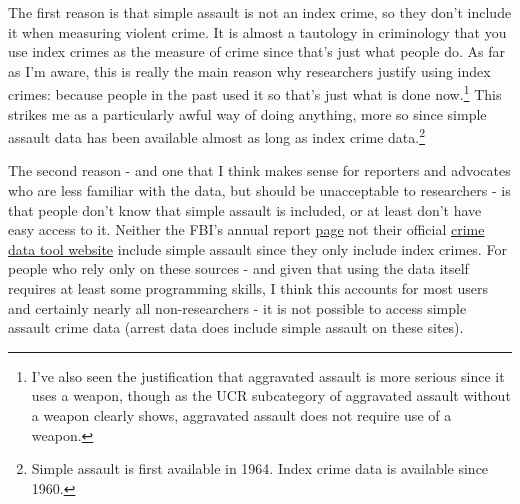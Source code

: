 \documentclass[
  12pt,
  openany]{book}
\begin{document}
The first reason is that simple assault is not an index crime, so they don't include it when measuring violent crime. It is almost a tautology in criminology that you use index crimes as the measure of crime since that's just what people do. As far as I'm aware, this is really the main reason why researchers justify using index crimes: because people in the past used it so that's just what is done now.\footnote{I've also seen the justification that aggravated assault is more serious since it uses a weapon, though as the UCR subcategory of aggravated assault without a weapon clearly shows, aggravated assault does not require use of a weapon.} This strikes me as a particularly awful way of doing anything, more so since simple assault data has been available almost as long as index crime data.\footnote{Simple assault is first available in 1964. Index crime data is available since 1960.}

The second reason - and one that I think makes sense for reporters and advocates who are less familiar with the data, but should be unacceptable to researchers - is that people don't know that simple assault is included, or at least don't have easy access to it. Neither the FBI's annual report \href{https://ucr.fbi.gov/crime-in-the-u.s/2019/crime-in-the-u.s.-2019/home}{page} not their official \href{https://crime-data-explorer.fr.cloud.gov/}{crime data tool website} include simple assault since they only include index crimes. For people who rely only on these sources - and given that using the data itself requires at least some programming skills, I think this accounts for most users and certainly nearly all non-researchers - it is not possible to access simple assault crime data (arrest data does include simple assault on these sites).
\end{document}
